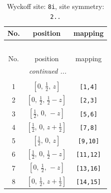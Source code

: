 \documentclass[fleqn,8pt]{jsarticle}
\begin{document}
\renewcommand{\arraystretch}{1.2}
\begin{longtable}{ccc}
\caption{Wyckoff site: {\tt 8i}, site symmetry: {\tt 2..}}
 \\
 \hline \hline
No. & position & mapping \\ \hline \endfirsthead

\multicolumn{2}{l}{\tablename\ \thetable{}} \\
 \hline \hline
No. & position & mapping \\ \hline \endhead

 \hline \hline
\multicolumn{2}{r}{\footnotesize\it continued ...} \\ \endfoot

 \hline \hline
\multicolumn{2}{r}{} \\ \endlastfoot

1 & $\left[ 0,\, \frac{1}{2},\, z \right]$ & {\tt [1,4]} \\ \hline
2 & $\left[ 0,\, \frac{1}{2},\, \frac{1}{2} - z \right]$ & {\tt [2,3]} \\ \hline
3 & $\left[ \frac{1}{2},\, 0,\, - z \right]$ & {\tt [5,6]} \\ \hline
4 & $\left[ \frac{1}{2},\, 0,\, z + \frac{1}{2} \right]$ & {\tt [7,8]} \\ \hline
5 & $\left[ \frac{1}{2},\, 0,\, z \right]$ & {\tt [9,10]} \\ \hline
6 & $\left[ \frac{1}{2},\, 0,\, \frac{1}{2} - z \right]$ & {\tt [11,12]} \\ \hline
7 & $\left[ 0,\, \frac{1}{2},\, - z \right]$ & {\tt [13,16]} \\ \hline
8 & $\left[ 0,\, \frac{1}{2},\, z + \frac{1}{2} \right]$ & {\tt [14,15]} \\
\end{longtable}
\renewcommand{\arraystretch}{1.2}
\end{document}

